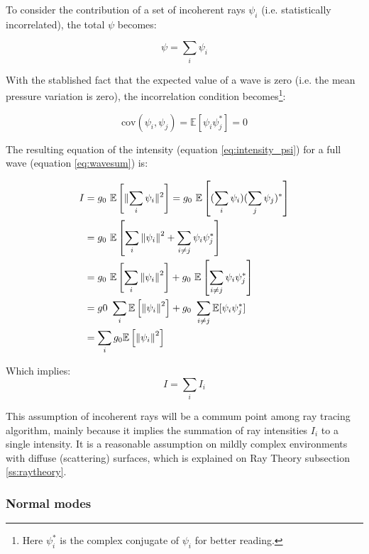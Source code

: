 To consider the contribution of a set of incoherent rays $\psi_i$ (i.e.
statistically incorrelated), the total $\psi$ becomes:

\begin{equation}\label{eq:wavesum}
\psi = \sum_i \psi_i 
\end{equation}

With the stablished fact that the expected value of a wave is zero (i.e. the
mean pressure variation is zero), the incorrelation condition
becomes\footnote{Here $\psi_i^*$ is the complex conjugate of $\psi_i$ for
better reading.}:


\begin{equation}
\label{eq:wave_uncorr}
\text{cov}(\psi_i,\psi_j) = \mathbb{E}[\psi_i \psi_j^*] = 0
\end{equation}

The resulting equation of the intensity (equation \ref{eq:intensity_psi}) for a
full wave (equation \ref{eq:wavesum}) is:

\begin{equation*}
\begin{split}
I &= g_0~\mathbb{E}\left[\lVert \sum_i \psi_i \rVert ^2\right] =
g_0~\mathbb{E}\left[ (\sum_i \psi_i)(\sum_j \psi_j)^*\right] \\
&= g_0~\mathbb{E}\left[\sum_i \left\lVert\psi_i\right\rVert^2 + \sum_{i \neq j} \psi_i
\psi_j^*\right] \\
&= g_0~\mathbb{E}\left[\sum_i \left\lVert\psi_i\right\rVert^2\right]  +
g_0~\mathbb{E}\left[\sum_{i \neq j} \psi_i \psi_j^*\right] \\
& = g0~\sum_i \mathbb{E}\left[\left\lVert\psi_i\right\rVert^2\right]  + g_0~\sum_{i \neq j}
\mathbb{E}[\psi_i \psi_j^*] \\
& = \sum_i g_0\mathbb{E}\left[\left\lVert\psi_i\right\rVert^2\right]
\end{split}
\end{equation*}

Which implies:
\begin{equation}
\label{eq:intensity_sum}
I = \sum_i I_i
\end{equation}

This assumption of incoherent rays will be a commum point among ray tracing
algorithm, mainly because it implies the summation of ray intensities $I_i$ to a
single intensity. It is a reasonable assumption on mildly complex environments
with diffuse (scattering) surfaces, which is explained on Ray Theory subsection
\ref{ss:raytheory}.


\subsubsection{Normal modes}

